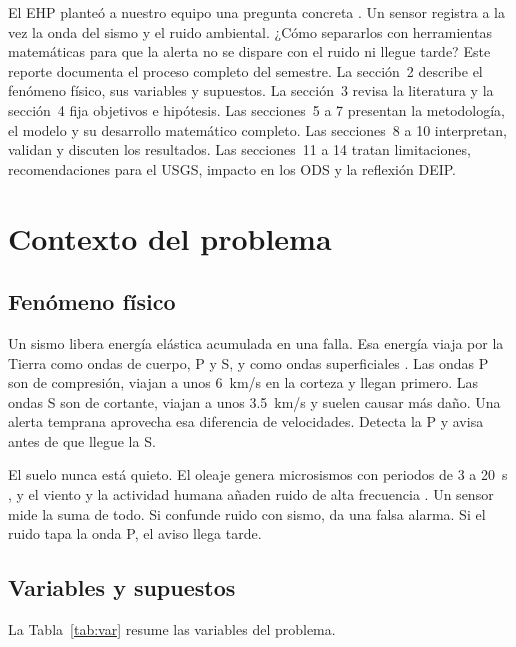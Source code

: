 \documentclass[11pt,letterpaper]{article}
\begin{document}
El EHP planteó a nuestro equipo una pregunta concreta \parencite{expediente}. Un sensor registra a la vez la onda del sismo y el ruido ambiental. ¿Cómo separarlos con herramientas matemáticas para que la alerta no se dispare con el ruido ni llegue tarde? Este reporte documenta el proceso completo del semestre. La sección~2 describe el fenómeno físico, sus variables y supuestos. La sección~3 revisa la literatura y la sección~4 fija objetivos e hipótesis. Las secciones~5 a 7 presentan la metodología, el modelo y su desarrollo matemático completo. Las secciones~8 a 10 interpretan, validan y discuten los resultados. Las secciones~11 a 14 tratan limitaciones, recomendaciones para el USGS, impacto en los ODS y la reflexión DEIP.

\section{Contexto del problema}
\subsection{Fenómeno físico}
Un sismo libera energía elástica acumulada en una falla. Esa energía viaja por la Tierra como ondas de cuerpo, P y S, y como ondas superficiales \parencite{shearer2019}. Las ondas P son de compresión, viajan a unos \SI{6}{km/s} en la corteza y llegan primero. Las ondas S son de cortante, viajan a unos \SI{3.5}{km/s} y suelen causar más daño. Una alerta temprana aprovecha esa diferencia de velocidades. Detecta la P y avisa antes de que llegue la S.

El suelo nunca está quieto. El oleaje genera microsismos con periodos de 3 a \SI{20}{s} \parencite{longuet1950}, y el viento y la actividad humana añaden ruido de alta frecuencia \parencite{peterson1993,mcnamara2004}. Un sensor mide la suma de todo. Si confunde ruido con sismo, da una falsa alarma. Si el ruido tapa la onda P, el aviso llega tarde.

\subsection{Variables y supuestos}
La Tabla~\ref{tab:var} resume las variables del problema.
\end{document}
